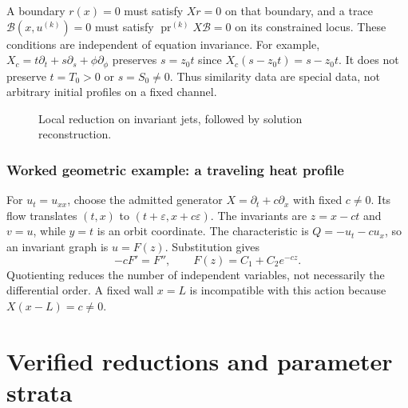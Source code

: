 \documentclass[11pt,a4paper,oneside]{report}
\numberwithin{equation}{chapter}
\newcommand{\E}{\mathcal E}
\newcommand{\pr}{\operatorname{pr}}
\begin{document}
A boundary $r(x)=0$ must satisfy $Xr=0$ on that boundary, and a trace $\mathcal B(x,u^{(k)})=0$ must satisfy $\pr^{(k)}X\mathcal B=0$ on its constrained locus. These conditions are independent of equation invariance. For example, $X_c=t\partial_t+s\partial_s+\phi\partial_\phi$ preserves $s=z_0t$ since $X_c(s-z_0t)=s-z_0t$. It does not preserve $t=T_0>0$ or $s=S_0\ne0$. Thus similarity data are special data, not arbitrary initial profiles on a fixed channel.
\begin{figure}[htbp]\centering
{}
\caption{Local reduction on invariant jets, followed by solution reconstruction.}\label{fig:quotient}
\end{figure}


\subsection*{Worked geometric example: a traveling heat profile}
For $u_t=u_{xx}$, choose the admitted generator $X=\partial_t+c\partial_x$ with fixed $c\ne0$. Its flow translates $(t,x)$ to $(t+\varepsilon,x+c\varepsilon)$. The invariants are $z=x-ct$ and $v=u$, while $y=t$ is an orbit coordinate. The characteristic is $Q=-u_t-cu_x$, so an invariant graph is $u=F(z)$. Substitution gives
\begin{equation}
-cF'=F'',\qquad F(z)=C_1+C_2e^{-cz}.
\end{equation}
Quotienting reduces the number of independent variables, not necessarily the differential order. A fixed wall $x=L$ is incompatible with this action because $X(x-L)=c\ne0$.

\chapter{Verified reductions and parameter strata}\label{ch:reduction}
\end{document}
